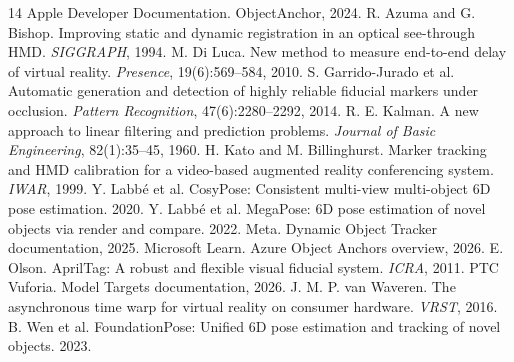 \documentclass[10pt,journal,compsoc]{IEEEtran}
\begin{document}
\begin{thebibliography}{14}
 Apple Developer Documentation. ObjectAnchor, 2024.
 R. Azuma and G. Bishop. Improving static and dynamic registration in an optical see-through HMD. \emph{SIGGRAPH}, 1994.
 M. Di Luca. New method to measure end-to-end delay of virtual reality. \emph{Presence}, 19(6):569--584, 2010.
 S. Garrido-Jurado et al. Automatic generation and detection of highly reliable fiducial markers under occlusion. \emph{Pattern Recognition}, 47(6):2280--2292, 2014.
 R. E. Kalman. A new approach to linear filtering and prediction problems. \emph{Journal of Basic Engineering}, 82(1):35--45, 1960.
 H. Kato and M. Billinghurst. Marker tracking and HMD calibration for a video-based augmented reality conferencing system. \emph{IWAR}, 1999.
 Y. Labb\'e et al. CosyPose: Consistent multi-view multi-object 6D pose estimation. 2020.
 Y. Labb\'e et al. MegaPose: 6D pose estimation of novel objects via render and compare. 2022.
 Meta. Dynamic Object Tracker documentation, 2025.
 Microsoft Learn. Azure Object Anchors overview, 2026.
 E. Olson. AprilTag: A robust and flexible visual fiducial system. \emph{ICRA}, 2011.
 PTC Vuforia. Model Targets documentation, 2026.
 J. M. P. van Waveren. The asynchronous time warp for virtual reality on consumer hardware. \emph{VRST}, 2016.
 B. Wen et al. FoundationPose: Unified 6D pose estimation and tracking of novel objects. 2023.
\end{thebibliography}
\end{document}
